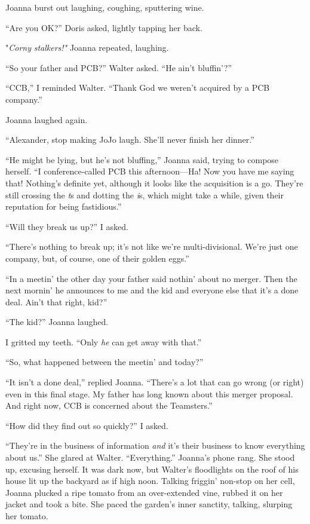 Joanna burst out laughing, coughing, sputtering wine.

``Are you OK?'' Doris asked, lightly tapping her back.

"\emph{Corny} \emph{stalkers!"} Joanna repeated, laughing.

``So your father and PCB?'' Walter asked. ``He ain't bluffin'?''

``CCB,'' I reminded Walter. ``Thank God we weren't acquired by a PCB
company.''

Joanna laughed again.

``Alexander, stop making JoJo laugh. She'll never finish her dinner.''

``He might be lying, but he's not bluffing,'' Joanna said, trying to
compose herself. ``I conference-called PCB this afternoon---Ha! Now you
have me saying that! Nothing's definite yet, although it looks like the
acquisition is a go. They're still crossing the \emph{t}s and dotting
the \emph{i}s, which might take a while, given their reputation for
being fastidious.''

``Will they break us up?'' I asked.

``There's nothing to break up; it's not like we're multi-divisional.
We're just one company, but, of course, one of their golden eggs.''

``In a meetin' the other day your father said nothin' about no merger.
Then the next mornin' he announces to me and the kid and everyone else
that it's a done deal. Ain't that right, kid?''

``The kid?'' Joanna laughed.

I gritted my teeth. ``Only \emph{he} can get away with that.''

``So, what happened between the meetin' and today?''

``It isn't a done deal,'' replied Joanna. ``There's a lot that can go
wrong (or right) even in this final stage. My father has long known
about this merger proposal. And right now, CCB is concerned about the
Teamsters.''

``How did they find out so quickly?'' I asked.

``They're in the business of information \emph{and} it's their business
to know everything about us.'' She glared at Walter. ``Everything.''
Joanna's phone rang. She stood up, excusing herself. It was dark now,
but Walter's floodlights on the roof of his house lit up the backyard as
if high noon. Talking friggin' non-stop on her cell, Joanna plucked a
ripe tomato from an over-extended vine, rubbed it on her jacket and took
a bite. She paced the garden's inner sanctity, talking, slurping her
tomato.

